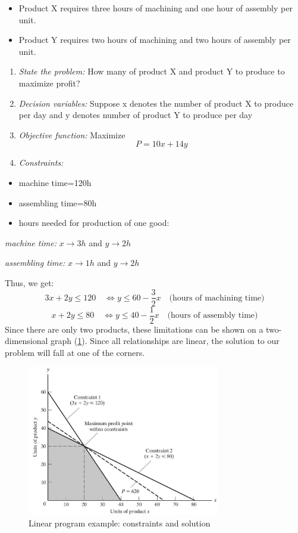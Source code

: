 \documentclass[
  12pt,
  oneside]{book}
\providecommand{\tightlist}{%
  \setlength{\itemsep}{0pt}\setlength{\parskip}{0pt}}
\theoremstyle{definition}
\theoremstyle{definition}
\theoremstyle{definition}
\theoremstyle{definition}
\theoremstyle{remark}
\begin{document}
\begin{itemize}
\tightlist
\item
  Product X requires three hours of machining and one hour of assembly per unit.
\item
  Product Y requires two hours of machining and two hours of assembly per unit.
\end{itemize}

\begin{enumerate}
\def\labelenumi{\arabic{enumi}.}
\tightlist
\item
  \emph{State the problem:} How many of product X and product Y to produce to maximize profit?
\item
  \emph{Decision variables:} Suppose x denotes the number of product X to produce per day and y denotes number of product Y to produce per day
\item
  \emph{Objective function:} Maximize \[P = 10x + 14y\]
\item
  \emph{Constraints:}
\end{enumerate}

\begin{itemize}
\tightlist
\item
  machine time=120h
\item
  assembling time=80h
\item
  hours needed for production of one good:
\end{itemize}

\emph{machine time:} \(x\rightarrow 3h\) and \(y \rightarrow 2h\)

\emph{assembling time:} \(x\rightarrow 1h\) and \(y \rightarrow 2h\)

Thus, we get:
\[3x + 2y \leq 120 \quad \Leftrightarrow y\leq 60-\frac{3}{2}x \quad \text{(hours of machining time)}\]
\[x + 2y \leq 80 \quad \Leftrightarrow y \leq 40-\frac{1}{2}x \quad \text{(hours of assembly time)}\]
Since there are only two products, these limitations can be shown on a two-dimensional graph (\ref{fig:lpe2}). Since all relationships are linear, the solution to our problem will fall at one of the corners.

\begin{figure}
\centering
\includegraphics[width=0.75\textwidth,height=\textheight]{fig/lpe2.jpg}
\caption{\label{fig:lpe2} Linear program example: constraints and solution}
\end{figure}
\end{document}
